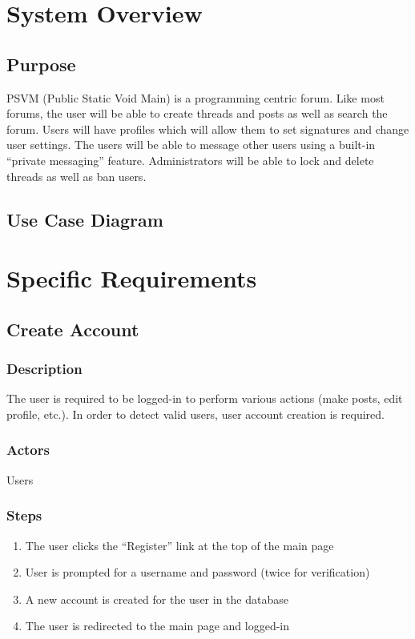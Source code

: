 \documentclass[12pt]{scrartcl}
\begin{document}
\section{System Overview}
\subsection{Purpose}

PSVM (Public Static Void Main) is a programming centric forum. Like most forums, the user will be able to create threads and posts as well as search the forum. Users will have profiles which will allow them to set signatures and change user settings.  The users will be able to message other users using a built-in “private messaging” feature. Administrators will be able to lock and delete threads as well as ban users.

\subsection{Use Case Diagram}

\section{Specific Requirements}
\subsection{Create Account}
\subsubsection{Description}

The user is required to be logged-in to perform various actions (make posts, edit profile, etc.).
In order to detect valid users, user account creation is required. 

\subsubsection{Actors}

Users

\subsubsection{Steps}

\begin{enumerate}
\item The user clicks the ``Register'' link at the top of the main page
\item User is prompted for a username and password (twice for verification)
\item A new account is created for the user in the database
\item The user is redirected to the main page and logged-in
\end{enumerate}
\end{document}

